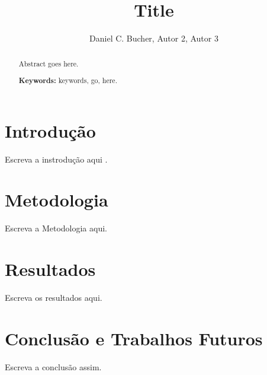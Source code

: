 \documentclass[12pt]{article}
\title{Title}
\author {Daniel C. Bucher\inst{1}, Autor 2\inst{2}, Autor 3\inst{1} }
\begin{document}
\maketitle

\begin{abstract}
  Abstract goes here.

\textbf{Keywords:} keywords, go, here.

\end{abstract}

\section{Introdução} \label{sec:intro}

Escreva a instrodução aqui \cite{campiolo2013}. 

\section{Metodologia} \label{sec:metod}

Escreva a Metodologia aqui.

\section{Resultados} \label{sec:res}

Escreva os resultados aqui.

\section{Conclusão e Trabalhos Futuros} \label{sec: concl}

Escreva a conclusão assim.



\end{document}
